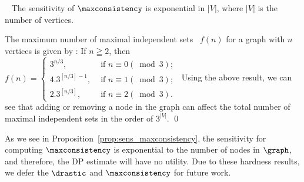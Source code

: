 \begin{proposition}~\label{prop:sens_maxconsistency}
     The sensitivity of $\maxconsistency$ is exponential in $|V|$, where $|V|$ is the number of vertices. 
\end{proposition}
\proof
The maximum number of maximal independent sets~\cite{moon1965cliques, GriggsGG88} $f(n)$ for a graph with $n$ vertices is given by :  If $n \geqq 2$, then $f(n)= \begin{cases}3^{n / 3}, & \text { if } n \equiv 0(\bmod 3) \text {; } \\ 4.3^{[n / 3]-1}, & \text { if } n \equiv 1(\bmod 3) \text {; } \\ 2.3^{[n / 3]}, & \text { if } n \equiv 2(\bmod 3) .\end{cases}$
Using the above result, we can see that adding or removing a node in the graph can affect the total number of maximal independent sets in the order of $3^{|V|}$.
\qed

As we see in Proposition~\ref{prop:sens_maxconsistency}, the sensitivity for computing $\maxconsistency$ is exponential to the number of nodes in $\graph$, and therefore, the DP estimate will have no utility.  Due to these hardness results, we defer the $\drastic$ and $\maxconsistency$ for future work. 